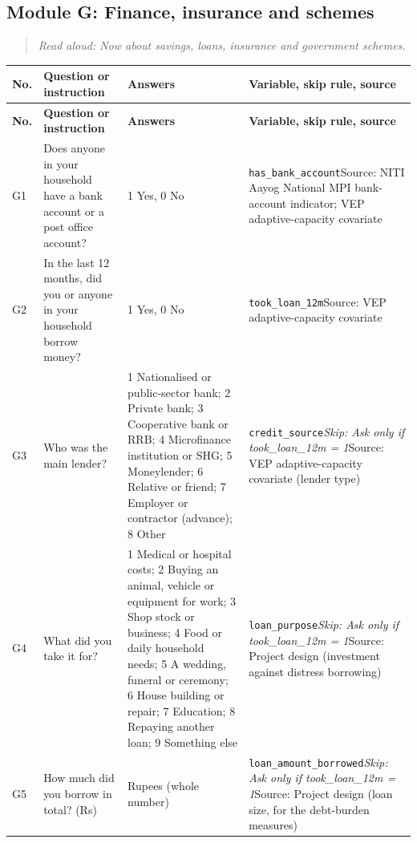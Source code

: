 \documentclass[10pt]{article}
\begin{document}
\subsection*{Module G: Finance, insurance and schemes}
\begin{quote}\small\textit{Read aloud: Now about savings, loans, insurance and government schemes.}\end{quote}
{\scriptsize
\begin{longtable}{p{0.8cm}p{6.4cm}p{3.6cm}p{5.8cm}}
\toprule
\textbf{No.} & \textbf{Question or instruction} & \textbf{Answers} & \textbf{Variable, skip rule, source} \\
\midrule
\endfirsthead
\toprule
\textbf{No.} & \textbf{Question or instruction} & \textbf{Answers} & \textbf{Variable, skip rule, source} \\
\midrule
\endhead
G1 & Does anyone in your household have a bank account or a post office account? & 1 Yes, 0 No & \texttt{has\_bank\_account}\newline Source: NITI Aayog National MPI bank-account indicator; VEP adaptive-capacity covariate \\
G2 & In the last 12 months, did you or anyone in your household borrow money? & 1 Yes, 0 No & \texttt{took\_loan\_12m}\newline Source: VEP adaptive-capacity covariate \\
G3 & Who was the main lender? & 1 Nationalised or public-sector bank; 2 Private bank; 3 Cooperative bank or RRB; 4 Microfinance institution or SHG; 5 Moneylender; 6 Relative or friend; 7 Employer or contractor (advance); 8 Other & \texttt{credit\_source}\newline \textit{Skip: Ask only if took\_loan\_12m = 1}\newline Source: VEP adaptive-capacity covariate (lender type) \\
G4 & What did you take it for? & 1 Medical or hospital costs; 2 Buying an animal, vehicle or equipment for work; 3 Shop stock or business; 4 Food or daily household needs; 5 A wedding, funeral or ceremony; 6 House building or repair; 7 Education; 8 Repaying another loan; 9 Something else & \texttt{loan\_purpose}\newline \textit{Skip: Ask only if took\_loan\_12m = 1}\newline Source: Project design (investment against distress borrowing) \\
G5 & How much did you borrow in total? (Rs) & Rupees (whole number) & \texttt{loan\_amount\_borrowed}\newline \textit{Skip: Ask only if took\_loan\_12m = 1}\newline Source: Project design (loan size, for the debt-burden measures) \\

\end{longtable}}
\end{document}
